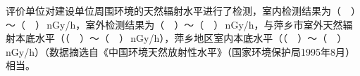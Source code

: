 评价单位对建设单位周围环境的天然辐射水平进行了检测，室内检测结果为（　）～（　）\,nGy/h，室外检测结果为（　）～（　）\,nGy/h，与萍乡市室外天然辐射本底水平（（　）～（　）\,nGy/h），萍乡地区室内本底水平（（　）～（　）\,nGy/h）（数据摘选自《中国环境天然放射性水平》（国家环境保护局1995年8月）相当。
